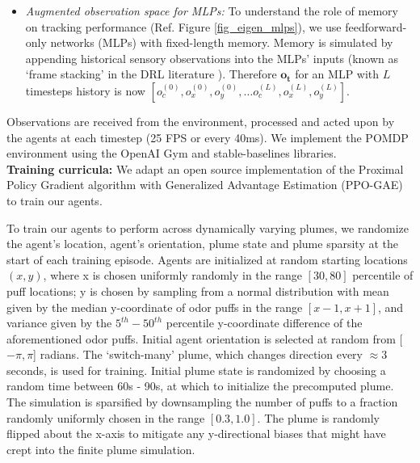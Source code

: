 \documentclass[5p,twocolumn,authoryear]{elsarticle}
\begin{document}
\begin{itemize}
    \item 
    \textit{Augmented observation space for MLPs:}
    To understand the role of memory on tracking performance (Ref. Figure \ref{fig_eigen_mlps}), we use feedforward-only networks (MLPs) with fixed-length memory. 
    Memory is simulated by appending historical sensory observations into the MLPs' inputs (known as `frame stacking' in the DRL literature \citep{mnih2013playing}).
    Therefore $\mathbf{o_t}$ for an MLP with $L$ timesteps history is now $[o^{(0)}_{c}, o^{(0)}_{x}, o^{(0)}_{y}, \dots o^{(L)}_{c}, o^{(L)}_{x}, o^{(L)}_{y} ] $.

\end{itemize}

Observations are received from the environment, processed and acted upon by the agents at each timestep (25 FPS or every 40ms).
We implement the POMDP environment using the OpenAI Gym \citep{brockman2016openai} and stable-baselines \citep{hill2018stable} libraries. 
\\

\textbf{Training curricula:}
We adapt an open source implementation \citep{kostrikov2018pytorch} of the Proximal Policy Gradient algorithm with Generalized Advantage Estimation (PPO-GAE) \citep{schulman2015high,schulman2017proximal} to train our agents.

To train our agents to perform across dynamically varying plumes, we randomize the agent's location, agent's  orientation, plume state and plume sparsity at the start of each training episode.
Agents are initialized at random starting locations $(x,y)$, where x is chosen uniformly randomly in the range $[30, 80]$ percentile of puff locations;
y is chosen by sampling from a normal distribution with mean given by the median y-coordinate of odor puffs in the range $[x-1, x+1]$, and variance given by the $5^{th} - 50^{th}$ percentile y-coordinate difference of the aforementioned odor puffs.
Initial agent orientation is selected at random from [$-\pi, \pi$] radians.
The `switch-many' plume, which changes direction every $\approx 3$ seconds, is used for training.
Initial plume state is randomized by choosing a random time between 60s - 90s, at which to initialize the precomputed plume.
The simulation is sparsified by downsampling the number of puffs to a fraction randomly uniformly chosen in the range $[0.3, 1.0]$. 
The plume is randomly flipped about the x-axis to mitigate any y-directional biases that might have crept into the finite plume simulation. 
\end{document}
